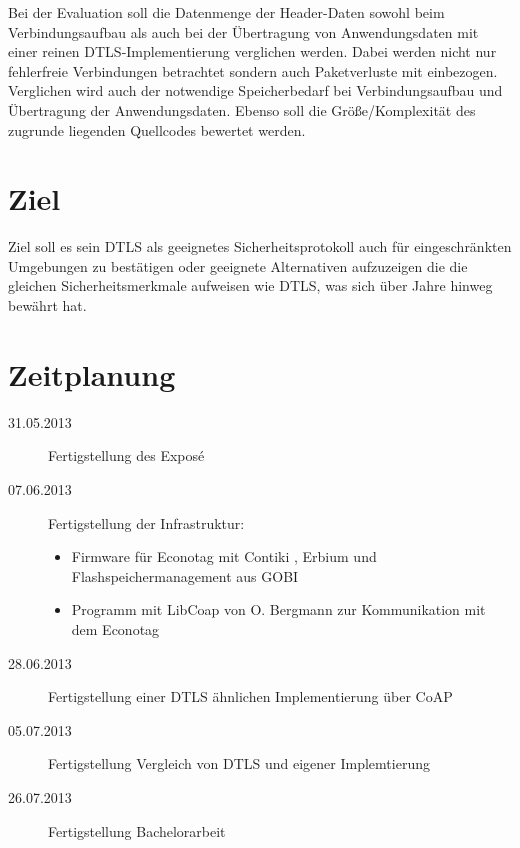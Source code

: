 \documentclass[a4paper,10pt]{report}
\begin{document}
Bei der Evaluation soll die Datenmenge der Header-Daten sowohl beim Verbindungsaufbau als auch bei der Übertragung von Anwendungsdaten
mit einer reinen DTLS-Implementierung verglichen werden. Dabei werden nicht nur fehlerfreie Verbindungen betrachtet sondern auch Paketverluste
mit einbezogen. Verglichen wird auch der notwendige Speicherbedarf bei Verbindungsaufbau und Übertragung der Anwendungsdaten.
Ebenso soll die Größe/Komplexität des zugrunde liegenden Quellcodes bewertet werden.

\section{Ziel}
Ziel soll es sein DTLS als geeignetes Sicherheitsprotokoll auch für eingeschränkten Umgebungen zu bestätigen oder geeignete Alternativen
aufzuzeigen die die gleichen Sicherheitsmerkmale aufweisen wie DTLS, was sich über Jahre hinweg bewährt hat.

\section{Zeitplanung}
\begin{description}
  \item[31.05.2013] Fertigstellung des Exposé
  \item[07.06.2013] Fertigstellung der Infrastruktur:
    \begin{itemize}
      \item Firmware für Econotag mit Contiki \cite{contiki}, Erbium \cite{erbium} und Flashspeichermanagement aus GOBI
      \item Programm mit LibCoap \cite{libcoap} von O. Bergmann zur Kommunikation mit dem Econotag
    \end{itemize}
  \item[28.06.2013] Fertigstellung einer DTLS ähnlichen Implementierung über CoAP
  \item[05.07.2013] Fertigstellung Vergleich von DTLS und eigener Implemtierung
  \item[26.07.2013] Fertigstellung Bachelorarbeit
\end{description}

\nocite{*}

\printbibliography
\end{document}

